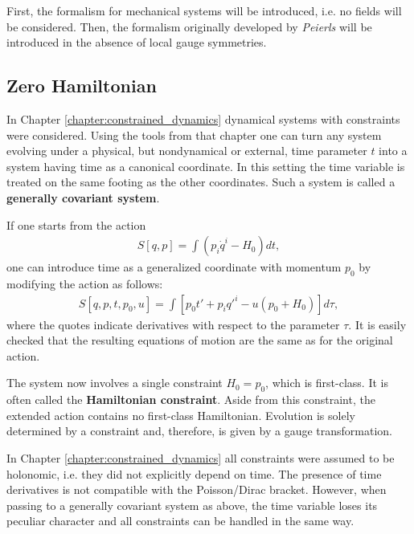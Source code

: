     First, the formalism for mechanical systems will be introduced, i.e. no fields will be considered. Then, the formalism originally developed by \textit{Peierls} will be introduced in the absence of local gauge symmetries.

\subsection{Zero Hamiltonian}

    In Chapter \ref{chapter:constrained_dynamics} dynamical systems with constraints were considered. Using the tools from that chapter one can turn any system evolving under a physical, but nondynamical or external, time parameter $t$ into a system having time as a canonical coordinate. In this setting the time variable is treated on the same footing as the other coordinates. Such a system is called a \textbf{generally covariant system}.

    If one starts from the action
    \begin{gather}
        S[q,p] = \int\left(p_i\dot{q}^i-H_0\right)dt,
    \end{gather}
    one can introduce time as a generalized coordinate with momentum $p_0$ by modifying the action as follows:
    \begin{gather}
        S[q,p,t,p_0,u] = \int\left[p_0t'+p_iq'^i-u(p_0+H_0)\right]d\tau,
    \end{gather}
    where the quotes indicate derivatives with respect to the parameter $\tau$. It is easily checked that the resulting equations of motion are the same as for the original action.

    The system now involves a single constraint $H_0=p_0$, which is first-class. It is often called the \textbf{Hamiltonian constraint}. Aside from this constraint, the extended action contains no first-class Hamiltonian. Evolution is solely determined by a constraint and, therefore, is given by a gauge transformation.

    \begin{remark}
        In Chapter \ref{chapter:constrained_dynamics} all constraints were assumed to be holonomic, i.e. they did not explicitly depend on time. The presence of time derivatives is not compatible with the Poisson/Dirac bracket. However, when passing to a generally covariant system as above, the time variable loses its peculiar character and all constraints can be handled in the same way.
    \end{remark}

